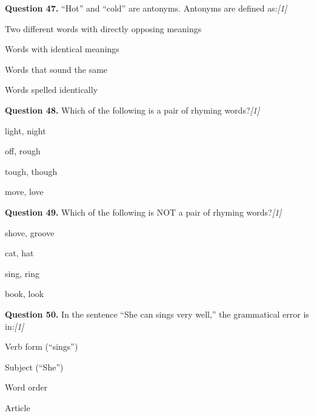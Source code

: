\documentclass[11pt,a4paper]{article}
\newcommand{\pts}[1]{\hfill   \textit{[#1]}}
\begin{document}
\medskip




\noindent   \textbf{Question 47.} ``Hot'' and ``cold'' are antonyms. Antonyms are defined as:\pts{1}

\begin{parts}
  \item Two different words with directly opposing meanings
  \item Words with identical meanings
  \item Words that sound the same
  \item Words spelled identically
\end{parts}

\medskip




\noindent   \textbf{Question 48.} Which of the following is a pair of rhyming words?\pts{1}

\begin{parts}
  \item light, night
  \item off, rough
  \item tough, though
  \item move, love
\end{parts}

\medskip




\noindent   \textbf{Question 49.} Which of the following is NOT a pair of rhyming words?\pts{1}

\begin{parts}
  \item shove, groove
  \item cat, hat
  \item sing, ring
  \item book, look
\end{parts}

\medskip




\noindent   \textbf{Question 50.} In the sentence ``She can sings very well,'' the grammatical error is in:\pts{1}

\begin{parts}
  \item Verb form (``sings'')
  \item Subject (``She'')
  \item Word order
  \item Article
\end{parts}

\medskip
\end{document}
